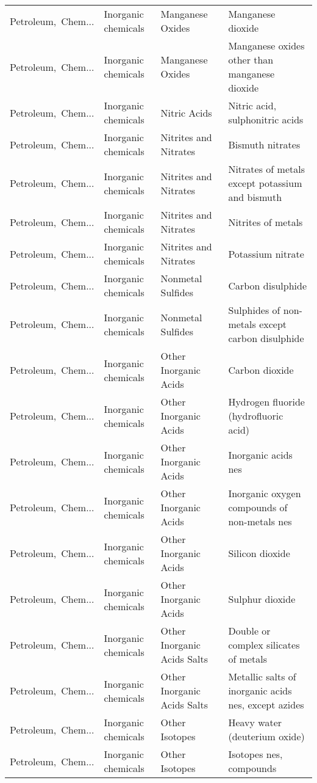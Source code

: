 \begin{appendices}
\begin{xltabular}{\textwidth}{|p{0.10\textwidth}|p{0.25\textwidth}|p{0.24\textwidth}|p{0.31\textwidth}|}
Petroleum,\ Chem... & Inorganic chemicals & Manganese Oxides & Manganese dioxide \\
Petroleum,\ Chem... & Inorganic chemicals & Manganese Oxides & Manganese oxides other than manganese dioxide \\
Petroleum,\ Chem... & Inorganic chemicals & Nitric Acids & Nitric acid, sulphonitric acids \\
Petroleum,\ Chem... & Inorganic chemicals & Nitrites and Nitrates & Bismuth nitrates \\
Petroleum,\ Chem... & Inorganic chemicals & Nitrites and Nitrates & Nitrates of metals except potassium and bismuth \\
Petroleum,\ Chem... & Inorganic chemicals & Nitrites and Nitrates & Nitrites of metals \\
Petroleum,\ Chem... & Inorganic chemicals & Nitrites and Nitrates & Potassium nitrate \\
Petroleum,\ Chem... & Inorganic chemicals & Nonmetal Sulfides & Carbon disulphide \\
Petroleum,\ Chem... & Inorganic chemicals & Nonmetal Sulfides & Sulphides of non-metals except carbon disulphide \\
Petroleum,\ Chem... & Inorganic chemicals & Other Inorganic Acids & Carbon dioxide \\
Petroleum,\ Chem... & Inorganic chemicals & Other Inorganic Acids & Hydrogen fluoride (hydrofluoric acid) \\
Petroleum,\ Chem... & Inorganic chemicals & Other Inorganic Acids & Inorganic acids nes \\
Petroleum,\ Chem... & Inorganic chemicals & Other Inorganic Acids & Inorganic oxygen compounds of non-metals nes \\
Petroleum,\ Chem... & Inorganic chemicals & Other Inorganic Acids & Silicon dioxide \\
Petroleum,\ Chem... & Inorganic chemicals & Other Inorganic Acids & Sulphur dioxide \\
Petroleum,\ Chem... & Inorganic chemicals & Other Inorganic Acids Salts & Double or complex silicates of metals \\
Petroleum,\ Chem... & Inorganic chemicals & Other Inorganic Acids Salts & Metallic salts of inorganic acids nes, except azides \\
Petroleum,\ Chem... & Inorganic chemicals & Other Isotopes & Heavy water (deuterium oxide) \\
Petroleum,\ Chem... & Inorganic chemicals & Other Isotopes & Isotopes nes, compounds \\

\end{xltabular}
\end{appendices}
